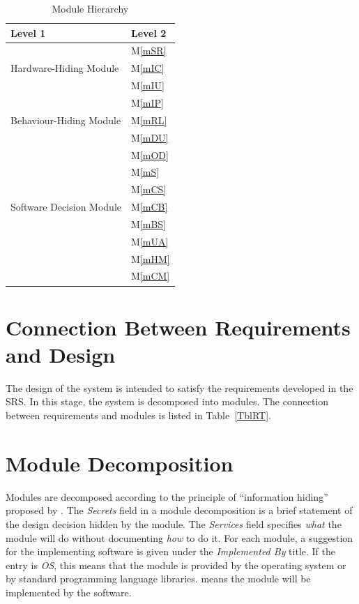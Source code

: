 \documentclass[12pt, titlepage]{article}
\newcommand{\mref}[1]{M\ref{#1}}
\begin{document}
\begin{table}[h!]
\centering
\begin{tabular}{p{} p{}}
\toprule
\textbf{Level 1} & \textbf{Level 2}\\
\midrule
\multirow{3}{0.3\textwidth}{Hardware-Hiding Module} & \mref{mSR}\\
& \mref{mIC}\\
& \mref{mIU}\\
\midrule

\multirow{3}{0.3\textwidth}{Behaviour-Hiding Module} 
& \mref{mIP} \\
& \mref{mRL} \\
& \mref{mDU} \\
\midrule

\multirow{7}{0.3\textwidth}{Software Decision Module} & \mref{mOD}\\
& \mref{mS} \\
& \mref{mCS}\\
& \mref{mCB}\\
& \mref{mBS} \\
& \mref{mUA} \\
& \mref{mHM} \\
& \mref{mCM} \\
\bottomrule

\end{tabular}
\caption{Module Hierarchy}
\label{TblMH}
\end{table}

\section{Connection Between Requirements and Design} \label{SecConnection}

The design of the system is intended to satisfy the requirements developed in
the SRS. In this stage, the system is decomposed into modules. The connection
between requirements and modules is listed in Table~\ref{TblRT}.

\section{Module Decomposition} \label{SecMD}

Modules are decomposed according to the principle of ``information hiding''
proposed by \citet{ParnasEtAl1984}. The \emph{Secrets} field in a module
decomposition is a brief statement of the design decision hidden by the
module. The \emph{Services} field specifies \emph{what} the module will do
without documenting \emph{how} to do it. For each module, a suggestion for the
implementing software is given under the \emph{Implemented By} title. If the
entry is \emph{OS}, this means that the module is provided by the operating
system or by standard programming language libraries.  \emph{\progname{}} means the
module will be implemented by the \progname{} software.
\end{document}
